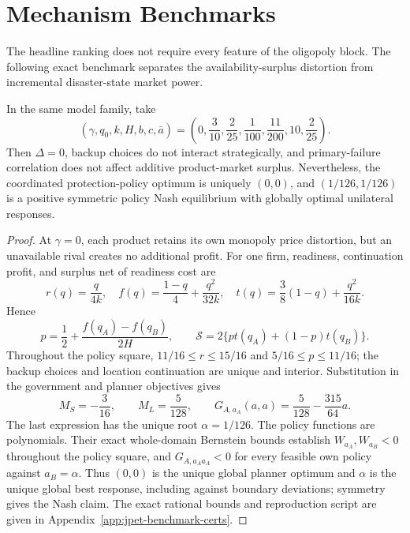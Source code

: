 \section{Mechanism Benchmarks}\label{sec:benchmarks}

The headline ranking does not require every feature of the oligopoly block. The following exact benchmark separates the availability-surplus distortion from incremental disaster-state market power.

\begin{proposition}\label{prop:zero-delta}
In the same model family, take
\begin{equation}
(\gamma,q_0,k,H,b,c,\bar a)
=\left(0,\frac3{10},\frac2{25},\frac1{100},\frac{11}{200},10,\frac2{25}\right).
\label{eq:zero-delta-witness}
\end{equation}
Then $\Delta=0$, backup choices do not interact strategically, and primary-failure correlation does not affect additive product-market surplus. Nevertheless, the coordinated protection-policy optimum is uniquely $(0,0)$, and $(1/126,1/126)$ is a positive symmetric policy Nash equilibrium with globally optimal unilateral responses.
\end{proposition}

\begin{proof}
At $\gamma=0$, each product retains its own monopoly price distortion, but an unavailable rival creates no additional profit. For one firm, readiness, continuation profit, and surplus net of readiness cost are
\begin{equation}
r(q)=\frac{q}{4k},\quad
f(q)=\frac{1-q}{4}+\frac{q^2}{32k},\quad
t(q)=\frac38(1-q)+\frac{q^2}{16k}.
\end{equation}
Hence
\begin{equation}
p=\frac12+\frac{f(q_A)-f(q_B)}{2H},\qquad
\mathcal S=2\{pt(q_A)+(1-p)t(q_B)\}.
\end{equation}
Throughout the policy square, $11/16\leq r\leq15/16$ and $5/16\leq p\leq11/16$; the backup choices and location continuation are unique and interior. Substitution in the government and planner objectives gives
\begin{equation}
M_S=-\frac3{16},\qquad M_L=\frac5{128},\qquad
G_{A,a_A}(a,a)=\frac5{128}-\frac{315}{64}a.
\end{equation}
The last expression has the unique root $\alpha=1/126$. The policy functions are polynomials. Their exact whole-domain Bernstein bounds establish $W_{a_A},W_{a_B}<0$ throughout the policy square, and $G_{A,a_Aa_A}<0$ for every feasible own policy against $a_B=\alpha$. Thus $(0,0)$ is the unique global planner optimum and $\alpha$ is the unique global best response, including against boundary deviations; symmetry gives the Nash claim. The exact rational bounds and reproduction script are given in Appendix~\ref{app:jpet-benchmark-certs}.
\end{proof}


